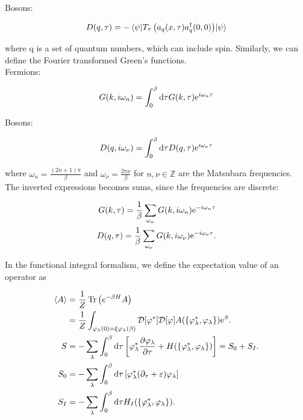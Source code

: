 Bosons: 

\begin{equation*}
    D(q, \tau) = -\mel{\psi}{T_\tau \left(a_q(x,\tau)a_q^{\dagger}(0,0)\right)}{\psi}
\end{equation*}

where q is a set of quantum numbers, which can include spin. Similarly, we can define the Fourier transformed Green's functions. \\ 

Fermions: 

\begin{equation*}
    G(k, i\omega_n) = \int_{0}^{\beta} \dd \tau G(k, \tau) \mathrm{e}^{i\omega_n \tau}
\end{equation*}

Bosons: 

\begin{equation*}
    D(q, i\omega_\nu) = \int_{0}^{\beta} \dd \tau D(q, \tau) \mathrm{e}^{i\omega_\nu\tau}
\end{equation*}

where $\omega_n = \frac{(2n+1)\pi}{\beta}$ and $\omega_\nu = \frac{2\pi \nu}{\beta}$ for $n, \nu \in \mathbb{Z}$ are the Matsubara frequencies. The inverted expressions becomes sums, since the frequencies are discrete: 

\begin{align*}
    G(k, \tau) = \frac{1}{\beta}\sum_{\omega_n}G(k, i\omega_n)\mathrm{e}^{-i\omega_n \tau} \\ 
    D(q,\tau) = \frac{1}{\beta}\sum_{\omega_\nu}G(k, i\omega_\nu)\mathrm{e}^{-i\omega_\nu \tau}. 
\end{align*}

In the functional integral formalism, we define the expectation value of an operator as


    
\begin{align*}
    \expval{A} &= \frac{1}{Z} \Tr \left( e^{-\beta H} A \right) \\
    &= \frac{1}{Z}\int_{\varphi_\lambda(0) = \xi \varphi_\lambda(\beta)} \mathcal{D} [\varphi^*] \mathcal{D}[\varphi]A(\{\varphi_\lambda^*, \varphi_\lambda\})\mathrm{e}^S. \\ 
    S &= - \sum_\lambda \int_{0}^{\beta} \dd \tau \left[ \varphi_\lambda ^* \pdv{\varphi_\lambda}{\tau} + H(\{\varphi_\lambda^*, \varphi_\lambda\})\right] = S_0 + S_I. \\
    S_0 &= - \sum_\lambda \int_{0}^{\beta} \dd \tau \left[ \varphi_\lambda ^* ( \partial_\tau + \varepsilon) \varphi_\lambda\right] \\ 
    S_I &= - \sum_\lambda \int_{0}^{\beta} \dd \tau H_I(\{\varphi_\lambda^*, \varphi_\lambda\}).
\end{align*}

